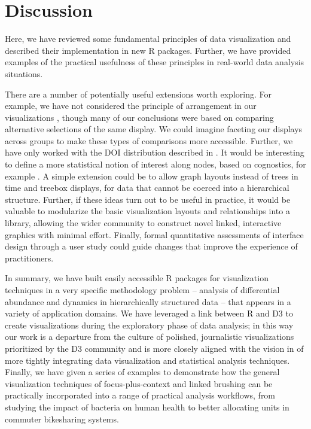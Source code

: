 \section{Discussion}
\label{conclusion}

Here, we have reviewed some fundamental principles of data visualization and
described their implementation in new R packages. Further, we have
provided examples of the practical usefulness of these principles in real-world
data analysis situations.

There are a number of potentially useful extensions worth exploring. For
example, we have not considered the principle of arrangement in our
visualizations \citep{buja1996interactive}, though many of our conclusions were
based on comparing alternative selections of the same display. We could imagine
faceting our displays across groups to make these types of comparisons more
accessible. Further, we have only worked with the DOI distribution described in
\citep{heer2004doitrees}. It would be interesting to define a more statistical
notion of interest along nodes, based on cognostics, for example
\citep{hafen2013trelliscope, friedman2002john}. A simple extension could be to
allow graph layouts instead of trees in time and treebox displays, for data that
cannot be coerced into a hierarchical structure. Further, if these ideas turn
out to be useful in practice, it would be valuable to modularize the basic
visualization layouts and relationships into a library, allowing the wider
community to construct novel linked, interactive graphics with minimal effort.
Finally, formal quantitative assessments of interface design through a user
study could guide changes that improve the experience of practitioners.

In summary, we have built easily accessible R packages for visualization
techniques in a very specific methodology problem -- analysis of differential
abundance and dynamics in hierarchically structured data -- that appears in a
variety of application domains. We have leveraged a link between R and D3
\citep{vaidyanathan2014htmlwidgets} to create visualizations during the
exploratory phase of data analysis; in this way our work is a departure from the
culture of polished, journalistic visualizations prioritized by the D3 community
and is more closely aligned with the vision in \citep{de2003visual} of more
tightly integrating data visualization and statistical analysis techniques.
Finally, we have given a series of examples to demonstrate how the general
visualization techniques of focus-plus-context and linked brushing can be
practically incorporated into a range of practical analysis workflows, from
studying the impact of bacteria on human health to better allocating units in
commuter bikesharing systems.
